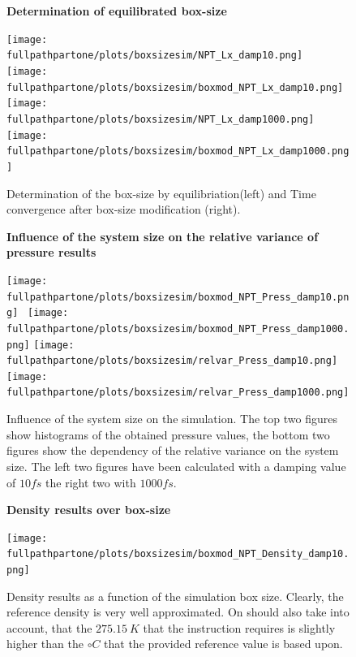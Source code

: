 \documentclass[10pt,a4paper]{report}
\def \fullpathpartone {/home/lukas/Desktop/project/independence/atomistic_modeling/exam/1_three-dimensional_atomic_system}
\newcommand*{\figuretitle}[1]{%
    {\centering%
    \textbf{#1}%
    \par\medskip}%
}
\begin{document}
\begin{center}
\begin{figure}[h]
\figuretitle{Determination of equilibrated box-size}
\texttt{[image: \\fullpathpartone/plots/boxsizesim/NPT\_Lx\_damp10.png]}~
\texttt{[image: \\fullpathpartone/plots/boxsizesim/boxmod\_NPT\_Lx\_damp10.png]}
\texttt{[image: \\fullpathpartone/plots/boxsizesim/NPT\_Lx\_damp1000.png]}~
\texttt{[image: \\fullpathpartone/plots/boxsizesim/boxmod\_NPT\_Lx\_damp1000.png]}
\caption[Determination of equilibrated box-size]{Determination of the box-size by equilibriation(left) and Time convergence after box-size modification (right). }
\label{fig:p1_boxsize}
\end{figure}
\end{center}


\begin{center}
\begin{figure}[h]
\figuretitle{Influence of the system size on the relative variance of pressure results}
\texttt{[image: \\fullpathpartone/plots/boxsizesim/boxmod\_NPT\_Press\_damp10.png]}~
\texttt{[image: \\fullpathpartone/plots/boxsizesim/boxmod\_NPT\_Press\_damp1000.png]}
\texttt{[image: \\fullpathpartone/plots/boxsizesim/relvar\_Press\_damp10.png]}~
\texttt{[image: \\fullpathpartone/plots/boxsizesim/relvar\_Press\_damp1000.png]}
\caption[Influence of the system size on the relative variance of pressure results]{Influence of the system size on the simulation. The top two figures show histograms of the obtained pressure values, the bottom two figures show the dependency of the relative variance on the system size. The left two figures have been calculated with a damping value of $10 fs$ the right two with $1000 fs$.}
\label{fig:pressure_over_boxsize}
\end{figure}
\end{center}


\begin{center}
\begin{figure}[h]
\figuretitle{Density results over box-size}
\texttt{[image: \\fullpathpartone/plots/boxsizesim/boxmod\_NPT\_Density\_damp10.png]}~
\caption[Density results over box-size]{Density results as a function of the simulation box size. Clearly, the reference density is very well approximated. On should also take into account, that the $275.15~K$ that the instruction requires is slightly higher than the $\circ C$ that the provided reference value is based upon.}
\label{fig:pressure_over_atomnum}
\end{figure}
\end{center}
\end{document}
